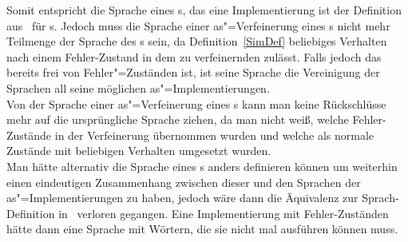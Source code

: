 Somit entspricht die Sprache eines \MEIO{}s, das eine Implementierung ist der
Definition aus~\cite{Schinko2016BA} für \EIO{}s. Jedoch muss die Sprache einer
as"=Verfeinerung eines \MEIO{}s nicht mehr Teilmenge der Sprache des
\MEIO{}s sein, da Definition~\ref{SimDef} beliebiges Verhalten nach einem
Fehler-Zustand in dem zu verfeinernden \MEIO{} zulässt. Falls jedoch das
\MEIO{} bereits frei von Fehler"=Zuständen ist, ist seine Sprache die
Vereinigung der Sprachen all seine möglichen as"=Implementierungen.\\
Von der Sprache einer as"=Verfeinerung eines \MEIO{}s kann man keine
Rückschlüsse mehr auf die ursprüngliche Sprache ziehen, da man nicht weiß,
welche Fehler-Zustände in der Verfeinerung übernommen wurden und welche als
normale Zustände mit beliebigen Verhalten umgesetzt wurden.\\
Man hätte alternativ die Sprache eines \MEIO{}s anders definieren können um
weiterhin einen eindeutigen Zusammenhang zwischen dieser und den Sprachen der
as"=Implementierungen zu haben, jedoch wäre dann die Äquivalenz zur \EIO{}
Sprach-Definition in~\cite{Schinko2016BA} verloren gegangen. Eine
Implementierung mit Fehler-Zuständen hätte dann eine Sprache mit Wörtern, die
sie nicht mal ausführen können muss.

